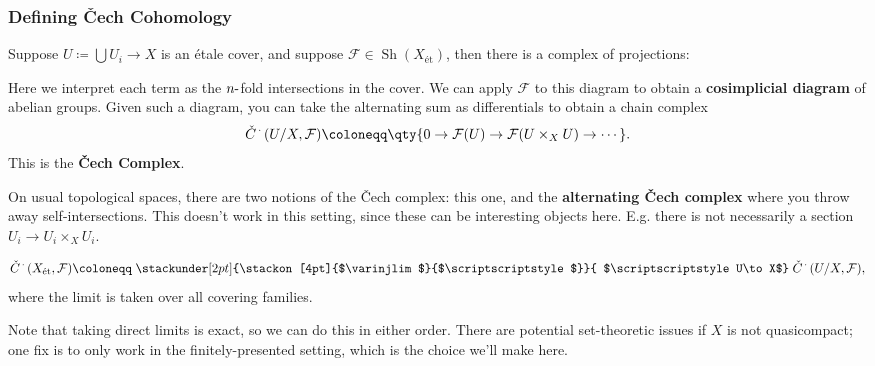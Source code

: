 \hypertarget{defining-ux10dech-cohomology}{%
\subsubsection{Defining Čech
Cohomology}\label{defining-ux10dech-cohomology}}

\begin{definition}

Suppose \(U \coloneqq\bigcup U_i \to X\) is an étale cover, and suppose
\(\mathcal{F}\in {\operatorname{Sh}}(X_\text{ét})\), then there is a
complex of projections:

Here we interpret each term as the \(n{\hbox{-}}\)fold intersections in
the cover. We can apply \(\mathcal{F}\) to this diagram to obtain a
\textbf{cosimplicial diagram} of abelian groups. Given such a diagram,
you can take the alternating sum as differentials to obtain a chain
complex
\begin{align*}  
\check{C}^{\,\cdot\,}(U/X, \mathcal{F}) \coloneqq\qty{ 0 \to \mathcal{F}(U) \to \mathcal{F}(U\times_X U) \to \cdots}
.\end{align*}
This is the \textbf{Čech Complex}.

\end{definition}

\begin{remark}

On usual topological spaces, there are two notions of the Čech complex:
this one, and the \textbf{alternating Čech complex} where you throw away
self-intersections. This doesn't work in this setting, since these can
be interesting objects here. E.g. there is not necessarily a section
\(U_i \to U_i \times_X U_i\).

\end{remark}

\begin{definition}

\begin{align*}  
\check{C}^{\,\cdot\,}(X_\text{ét}, \mathcal{F}) \coloneqq
  \mathrel{\stackunder[2pt]{\stackon[4pt]{$\varinjlim$}{$\scriptscriptstyle$}}{
  $\scriptscriptstyle U\to X$}}
\check{C}^{\,\cdot\,}(U/X, \mathcal{F})
,\end{align*}
where the limit is taken over all covering families.

\end{definition}

\begin{remark}

Note that taking direct limits is exact, so we can do this in either
order. There are potential set-theoretic issues if \(X\) is not
quasicompact; one fix is to only work in the finitely-presented setting,
which is the choice we'll make here.

\end{remark}

